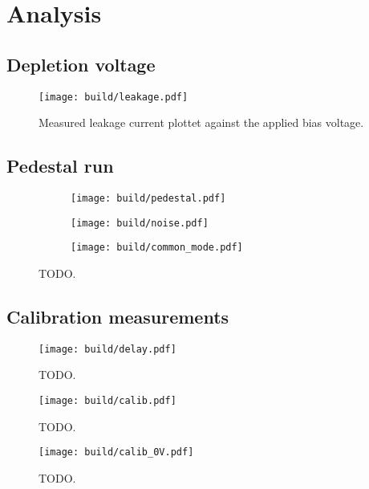 \section{Analysis}
\label{sec:Analysis}

\subsection{Depletion voltage}

\begin{figure}[H]
  \centering
  \texttt{[image: build/leakage.pdf]}
  \caption{Measured leakage current plottet against the applied bias voltage.}
  \label{fig:leakage}
\end{figure}

\subsection{Pedestal run}

\begin{figure}[H]
  \centering
    \begin{subfigure}{0.5\textwidth}
      \texttt{[image: build/pedestal.pdf]}
    \end{subfigure}
    \begin{subfigure}{0.5\textwidth}
      \texttt{[image: build/noise.pdf]}
    \end{subfigure}
    \begin{subfigure}{0.5\textwidth}
      \texttt{[image: build/common\_mode.pdf]}
    \end{subfigure}
  \caption{TODO.}
  \label{fig:pedestal_run}
\end{figure}

\subsection{Calibration measurements}

\begin{figure}[H]
  \centering
  \texttt{[image: build/delay.pdf]}
  \caption{TODO.}
  \label{fig:delay}
\end{figure}

\begin{figure}[H]
  \centering
  \texttt{[image: build/calib.pdf]}
  \caption{TODO.}
  \label{fig:calib}
\end{figure}

\begin{figure}[H]
  \centering
  \texttt{[image: build/calib\_0V.pdf]}
  \caption{TODO.}
  \label{fig:calib_0V}
\end{figure}

